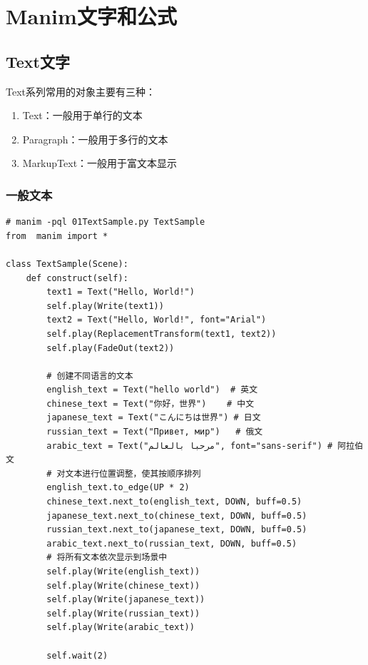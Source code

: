 \chapter{Manim文字和公式}
\label{cha:manim_text_formula}
\section{Text文字}
\label{sec:manim_text_formula_text}
Text系列常用的对象主要有三种：
\begin{enumerate}[label=\arabic*)]
    \item Text：一般用于单行的文本
    \item Paragraph：一般用于多行的文本
    \item MarkupText：一般用于富文本显示
\end{enumerate}

\subsection{一般文本}
\label{subsec:manim_text_formula_text_general}
\begin{lstlisting}[style=pythonstyle]
# manim -pql 01TextSample.py TextSample
from  manim import *

class TextSample(Scene):
    def construct(self):
        text1 = Text("Hello, World!")
        self.play(Write(text1))
        text2 = Text("Hello, World!", font="Arial")
        self.play(ReplacementTransform(text1, text2))
        self.play(FadeOut(text2))

        # 创建不同语言的文本
        english_text = Text("hello world")  # 英文
        chinese_text = Text("你好，世界")    # 中文
        japanese_text = Text("こんにちは世界") # 日文
        russian_text = Text("Привет, мир")   # 俄文
        arabic_text = Text("مرحبا بالعالم", font="sans-serif") # 阿拉伯文
        # 对文本进行位置调整，使其按顺序排列
        english_text.to_edge(UP * 2)
        chinese_text.next_to(english_text, DOWN, buff=0.5)
        japanese_text.next_to(chinese_text, DOWN, buff=0.5)
        russian_text.next_to(japanese_text, DOWN, buff=0.5)
        arabic_text.next_to(russian_text, DOWN, buff=0.5)
        # 将所有文本依次显示到场景中
        self.play(Write(english_text))
        self.play(Write(chinese_text))
        self.play(Write(japanese_text))
        self.play(Write(russian_text))
        self.play(Write(arabic_text))

        self.wait(2)
\end{lstlisting}      

